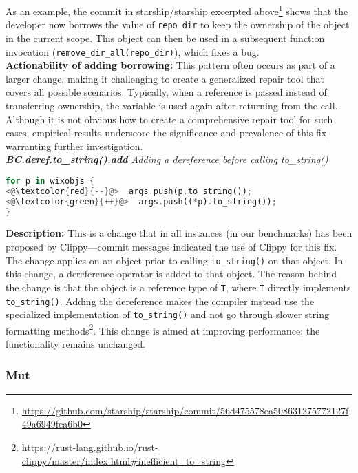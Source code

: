 As an example, the commit in starship/starship excerpted above\footnote{\scriptsize \url{https://github.com/starship/starship/commit/56d475578ea508631275772127f49a6949fea6b0}} shows that the developer now borrows the value of \verb+repo_dir+ to keep the ownership of the object in the current scope. This object can then be used in a subsequent function invocation (\verb+remove_dir_all(repo_dir)+), which fixes a bug. \\

\noindent\textbf{Actionability of adding borrowing:} This pattern often occurs as part of a larger change, making it challenging to create a generalized repair tool that covers all possible scenarios. Typically, when a reference is passed instead of transferring ownership, the variable is used again after returning from the call. Although it is not obvious how to create a comprehensive repair tool for such cases, empirical results underscore the significance and prevalence of this fix, warranting further investigation. \\

\noindent\textit{\textbf{BC.deref.to\_string().add} Adding a dereference before calling to\_string()}

\begin{lstlisting}[language=Rust, style=colouredRust]
for p in wixobjs {
<@\textcolor{red}{--}@>  args.push(p.to_string());
<@\textcolor{green}{++}@>  args.push((*p).to_string());
}

\end{lstlisting}

\noindent\textbf{Description:} This is a change that in all instances (in our benchmarks) has been proposed by Clippy---commit messages indicated the use of Clippy for this fix. The change applies on an object prior to calling \verb+to_string()+ on that object. In this change, a dereference operator is added to that object. The reason behind the change is that the object is a reference type of \verb+T+, where \verb+T+ directly implements \verb+to_string()+. Adding the dereference makes the compiler instead use the specialized implementation of \verb+to_string()+ and not go through slower string formatting methods\footnote{\url{https://rust-lang.github.io/rust-clippy/master/index.html\#inefficient\_to\_string}}. This change is aimed at improving performance; the functionality remains unchanged.


\subsubsection{Mut}

